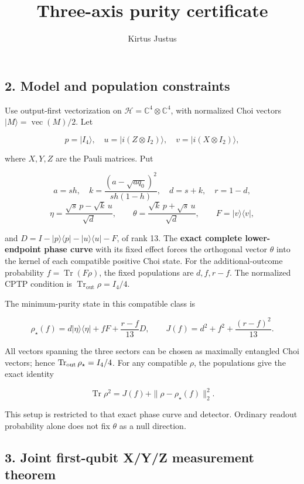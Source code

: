 \documentclass[
  10pt,
  a4paper,
]{article}
\title{Three-axis purity certificate}
\author{Kirtus Justus}
\date{}
\begin{document}
\maketitle

\subsection{2. Model and population constraints}\label{model-and-population-constraints}

Use output-first vectorization on \(\mathcal H=\mathbb C^4\otimes\mathbb C^4\), with normalized Choi vectors \(|M\rangle=\operatorname{vec}(M)/2\). Let

\[
 p=|I_4\rangle,\quad u=|i(Z\otimes I_2)\rangle,\quad v=|i(X\otimes I_2)\rangle,
\]

where \(X,Y,Z\) are the Pauli matrices. Put

\[
 a=sh,\quad k=\frac{(a-\sqrt{a q_0})^2}{s h(1-h)},\quad d=s+k,\quad r=1-d,
\] \[
 \eta=\frac{\sqrt{s}\,p-\sqrt{k}\,u}{\sqrt d},\qquad
 \theta=\frac{\sqrt{k}\,p+\sqrt{s}\,u}{\sqrt d},\qquad
 F=|v\rangle\langle v|,
\]

and \(D=I-|p\rangle\langle p|-|u\rangle\langle u|-F\), of rank 13. The \textbf{exact complete lower-endpoint phase curve} with its fixed effect forces the orthogonal vector \(\theta\) into the kernel of each compatible positive Choi state. For the additional-outcome probability \(f=\operatorname{Tr}(F\rho)\), the fixed populations are \(d,f,r-f\). The normalized CPTP condition is \(\operatorname{Tr}_{\mathrm{out}}\rho=I_4/4\).

The minimum-purity state in this compatible class is

\[
 \rho_\star(f)=d|\eta\rangle\langle\eta|+fF+\frac{r-f}{13}D,
 \qquad J(f)=d^2+f^2+\frac{(r-f)^2}{13}.
\]

All vectors spanning the three sectors can be chosen as maximally entangled Choi vectors; hence \(\operatorname{Tr}_{\rm out}\rho_\star=I_4/4\). For any compatible \(\rho\), the populations give the exact identity

\[
\operatorname{Tr}\rho^2=J(f)+\|\rho-\rho_\star(f)\|_2^2.
\]

This setup is restricted to that exact phase curve and detector. Ordinary readout probability alone does not fix \(\theta\) as a null direction.

\subsection{3. Joint first-qubit X/Y/Z measurement theorem}\label{joint-first-qubit-xyz-measurement-theorem}
\end{document}
